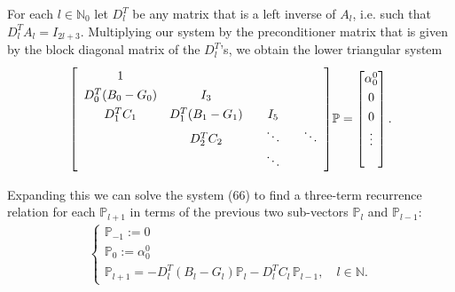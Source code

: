 \documentclass[11pt, oneside]{article}   	%
\newcommand{\N}{\mathbb{N}}
\newcommand{\No}{\mathbb{N}_0}
\newcommand{\bigP}{\mathbb{P}}
\newcommand{\Pl}{\mathbb{P}_l}
\newcommand{\Dlt}{D^T_l}
\begin{document}
For each \(l \in \No\) let \(\Dlt\) be any matrix that is a left inverse of \(A_l\), i.e. such that \(\Dlt A_l = I_{2l+3}\). Multiplying our system by the preconditioner matrix that is given by the block diagonal matrix of the \(\Dlt\)'s, we obtain the lower triangular system \citep{dunkl2014orthogonal}
\begin{align}
\renewcommand\arraystretch{1.3}
\mleft[
\begin{array}{cccc}
		1  & & & \\
		D^T_0(B_0-G_0) & I_3 & & \\
		D^T_1 C_1 & D^T_1(B_1-G_1) & \quad I_5 \quad & \\
		& D^T_2 C_2 & \ddots & \ddots \\
		& & \ddots &
\end{array}
\mright]
\bigP
=
\begin{bmatrix}
	\alpha^0_0 \\ 0 \\ 0 \\ \vdots \\ \\
\end{bmatrix}.
\end{align}

Expanding this we can solve the system (66) to find a three-term recurrence relation for each \(\bigP_{l+1}\) in terms of the previous two sub-vectors \(\Pl\) and \(\bigP_{l-1}\):
\begin{align}
\begin{cases}
\bigP_{-1} := 0 \\
\bigP_{0} := \alpha^0_0 \\
\bigP_{l+1} = -\Dlt (B_l-G_l) \Pl - \Dlt C_l  \,\bigP_{l-1}, \quad l \in \N.
\end{cases}
\end{align}
\end{document}

